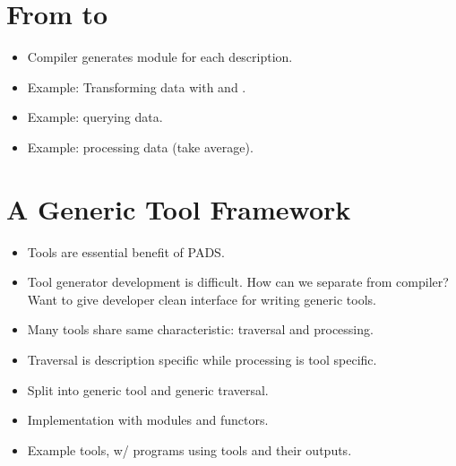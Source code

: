 
\section{From \padsmlbig{} to \ocaml{}}
\label{sec:padsml-impl}

\begin{itemize}
\item Compiler generates module for each description.
\item Example: Transforming data with \padsml{} and \ocaml{}.
\item Example: querying data.
\item Example: processing data (take average).
\end{itemize}


\section{A Generic Tool Framework}
\label{sec:gen-tool}

\begin{itemize}
\item Tools are essential benefit of PADS.
\item Tool generator development is difficult. How can we separate
  from compiler? Want to give developer clean interface for writing
  generic tools.
\item Many tools share same characteristic: traversal and processing.
\item Traversal is description specific while processing is tool specific.
\item Split into generic tool and generic traversal.
\item Implementation with modules and functors.
\item Example tools, w/ programs using tools and their outputs.
\end{itemize}
